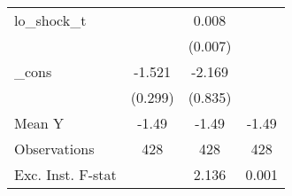 {\begin{tabular}{l*{3}{c}}
\addlinespace
lo\_shock\_t  &                     &       0.008         &                     \\
            &                     &     (0.007)         &                     \\
\addlinespace
\_cons      &      -1.521\sym{***}&      -2.169\sym{**} &                     \\
            &     (0.299)         &     (0.835)         &                     \\
\midrule
Mean Y      &       -1.49         &       -1.49         &       -1.49         \\
Observations&         428         &         428         &         428         \\
Exc. Inst. F-stat&                     &       2.136         &       0.001         \\
\bottomrule
\end{tabular}
}
